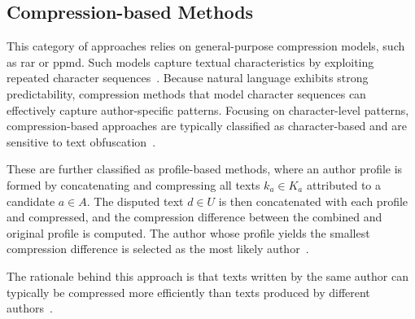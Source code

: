 \subsection{Compression-based Methods}
This category of approaches relies on general-purpose compression models, such as \ac{rar} or \ac{ppmd}. %
Such models capture textual characteristics by exploiting repeated character sequences~\citep{stamatatos_survey_2009,neal_surveying_2018}. 
Because natural language exhibits strong predictability, compression methods that model character sequences can effectively capture author-specific patterns.
Focusing on character-level patterns, compression-based approaches are typically classified as character-based and are sensitive to text obfuscation~\citep{bevendorff_divergence_based_2020}.

These are further classified as profile-based methods, where an author profile is formed by concatenating and compressing all texts $k_a \in K_a$ attributed to a candidate $a \in A$. 
The disputed text $d \in U$ is then concatenated with each profile and compressed, and the compression difference between the combined and original profile is computed. 
The author whose profile yields the smallest compression difference is selected as the most likely author~\citep{stamatatos_survey_2009,elmanarelbouanani_authorship_2014,neal_surveying_2018}.

The rationale behind this approach is that texts written by the same author can typically be compressed more efficiently than texts produced by different authors~\citep{stamatatos_survey_2009,elmanarelbouanani_authorship_2014}.


